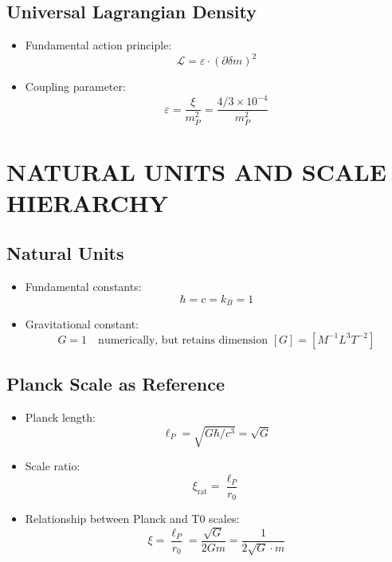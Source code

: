 \documentclass[12pt,a4paper]{article}
\begin{document}
	\subsection{Universal Lagrangian Density}
	\begin{itemize}
		\item Fundamental action principle:
		\begin{equation}
			\boxed{\mathcal{L} = \varepsilon \cdot (\partial \delta m)^2}
		\end{equation}
		
		\item Coupling parameter:
		\begin{equation}
			\varepsilon = \frac{\xi}{m_P^2} = \frac{4/3 \times 10^{-4}}{m_P^2}
		\end{equation}
	\end{itemize}
	
	\section{NATURAL UNITS AND SCALE HIERARCHY}
	
	\subsection{Natural Units}
	\begin{itemize}
		\item Fundamental constants:
		\begin{equation}
			\hbar = c = k_B = 1
		\end{equation}
		
		\item Gravitational constant:
		\begin{equation}
			G = 1 \quad \text{numerically, but retains dimension } [G] = [M^{-1}L^3T^{-2}]
		\end{equation}
	\end{itemize}
	
	\subsection{Planck Scale as Reference}
	\begin{itemize}
		\item Planck length:
		\begin{equation}
			\ell_P = \sqrt{G\hbar/c^3} = \sqrt{G}
		\end{equation}
		
		\item Scale ratio:
		\begin{equation}
			\xi_{\text{rat}} = \frac{\ell_P}{r_0}
		\end{equation}
		
		\item Relationship between Planck and T0 scales:
		\begin{equation}
			\xi = \frac{\ell_P}{r_0} = \frac{\sqrt{G}}{2Gm} = \frac{1}{2\sqrt{G} \cdot m}
		\end{equation}
	\end{itemize}
	
\end{document}
